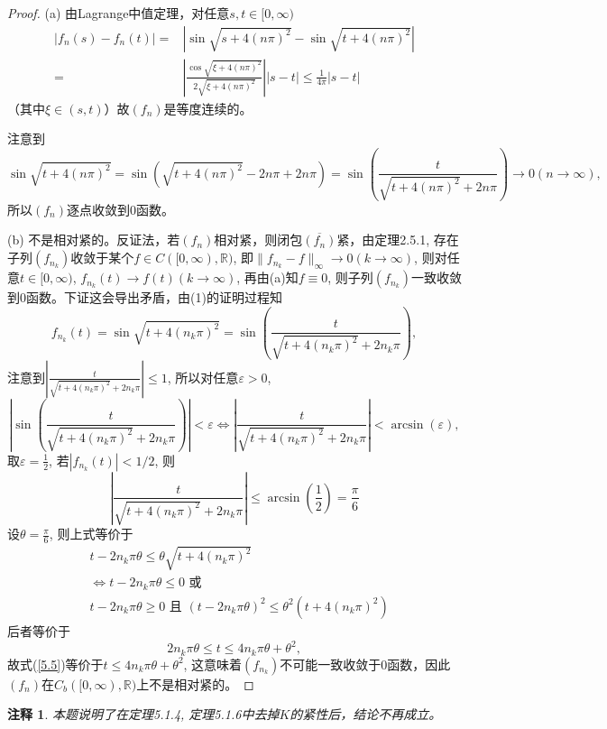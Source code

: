 \documentclass[a4paper,8pt]{ctexart}\textwidth 140mm \textheight 216mm
\newtheorem{Remark}{注释}[section]
\newcommand{\e}{\varepsilon}
\newcommand{\8}{\infty}
\begin{document}
\begin{proof}
	(a) 由Lagrange中值定理，对任意$s,t\in [0,\infty)$
	\begin{equation*}
	\begin{split}
	|f_n(s)-f_n(t)|=&|\sin\sqrt{s+4(n\pi)^2}-\sin\sqrt{t+4(n\pi)^2}|\\
	=&|\frac{\cos\sqrt{\xi+4(n\pi)^2}}{2\sqrt{\xi+4(n\pi)^2}}||s-t|\leq \frac{1}{4\pi}|s-t|
	\end{split}
	\end{equation*}
	（其中$\xi\in (s,t)$）故$(f_n)$是等度连续的。
	
	注意到
	\begin{equation*}
	\sin\sqrt{t+4(n\pi)^2}=\sin(\sqrt{t+4(n\pi)^2}-2n\pi+2n\pi)=\sin(\frac{t}{\sqrt{t+4(n\pi)^2}+2n\pi})\to 0(n\to\infty),
	\end{equation*}
	所以$(f_n)$逐点收敛到0函数。
	
	(b) 不是相对紧的。反证法，若$(f_n)$相对紧，则闭包$\overline{(f_n)}$紧，由定理2.5.1, 存在子列$(f_{n_k})$收敛于某个$f\in C([0,\infty),\mathbb{R})$, 即$\|f_{n_k}-f\|_\infty\to0(k\to\infty)$, 则对任意$t\in[0,\infty)$, $f_{n_k}(t)\to f(t)(k\to\infty)$, 再由(a)知$f\equiv0$, 则子列$(f_{n_k})$一致收敛到0函数。下证这会导出矛盾，由(1)的证明过程知
	\begin{equation*}
	f_{n_k}(t)=\sin\sqrt{t+4(n_k\pi)^2}=\sin(\frac{t}{\sqrt{t+4(n_k\pi)^2}+2n_k\pi}),
	\end{equation*}
	注意到$\left|\frac{t}{\sqrt{t+4(n_k\pi)^2}+2n_k\pi}\right|\leq 1$, 所以对任意$\e>0$, $$\left|\sin(\frac{t}{\sqrt{t+4(n_k\pi)^2}+2n_k\pi})\right|<\e\Leftrightarrow\left|\frac{t}{\sqrt{t+4(n_k\pi)^2}+2n_k\pi}\right|< \arcsin(\e),$$
	取$\e=\frac{1}{2}$, 若$|f_{n_k}(t)|<1/2$, 则
	\begin{equation}\label{5.5}
	\left|\frac{t}{\sqrt{t+4(n_k\pi)^2}+2n_k\pi}\right|\leq \arcsin(\frac{1}{2})=\frac{\pi}{6}
	\end{equation}
	设$\theta=\frac{\pi}{6}$, 则上式等价于
	\begin{equation*}
	\begin{split}
	&t-2n_k\pi \theta\leq\theta \sqrt{t+4(n_k\pi)^2}\\
	&\Leftrightarrow t-2n_k\pi \theta\leq 0\mbox{ 或 }\\
	&t-2n_k\pi \theta\geq 0\mbox{ 且 }(t-2n_k\pi \theta)^2\leq \theta^2(t+4(n_k\pi)^2)
	\end{split}
	\end{equation*}
	后者等价于
	\begin{equation*}
	2n_k\pi \theta \leq t\leq 4n_k\pi\theta+\theta^2,
	\end{equation*}
	故式(\ref{5.5})等价于$t\leq 4n_k\pi\theta+\theta^2$, 这意味着$(f_{n_k})$不可能一致收敛于0函数，因此$(f_n)$在$C_b([0,\infty),\mathbb{R})$上不是相对紧的。
\end{proof}
\begin{Remark}
	本题说明了在定理5.1.4, 定理5.1.6中去掉$K$的紧性后，结论不再成立。
\end{Remark}
\end{document}
